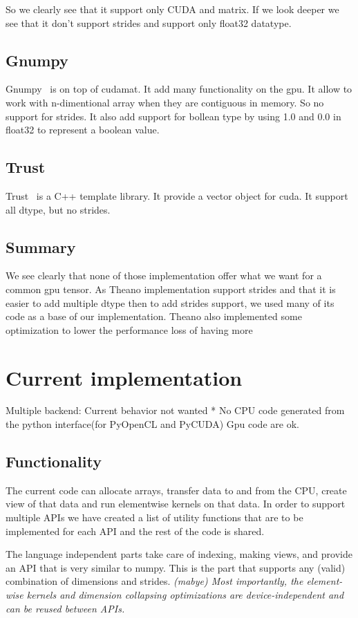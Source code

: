 \documentclass{article} %
\begin{document}
So we clearly see that it support only CUDA and matrix. If we look deeper we see that it don't support strides and support only float32 datatype.

\subsection{Gnumpy}
Gnumpy~\citep{gnumpy-TR2010} is on top of cudamat. It add many functionality on the gpu. It allow to work with n-dimentional array when they are contiguous in memory. So no support for strides. It also add support for bollean type by using 1.0 and 0.0 in float32 to represent a boolean value.

\subsection{Trust}
Trust~\citep{Thrust} is a C++ template library. It provide a vector object for cuda. It support all dtype, but no strides.

\subsection{Summary}
We see clearly that none of those implementation offer what we want for a common gpu tensor. As Theano implementation support strides and that it is easier to add multiple dtype then to add strides support, we used many of its code as a base of our implementation. Theano also implemented some optimization to lower the performance loss of having more

\section{Current implementation}

Multiple backend:
Current behavior not wanted
    * No CPU code generated from the python interface(for PyOpenCL and PyCUDA) Gpu code are ok.

\subsection{Functionality}

The current code can allocate arrays, transfer data to and from the CPU, create view of that data and run elementwise kernels on that data.  In order to support multiple APIs we have created a list of utility functions that are to be implemented for each API and the rest of the code is shared.

The language independent parts take care of indexing, making views, and provide an API that is very similar to numpy.  This is the part that supports any (valid) combination of dimensions and strides.  \emph{(mabye) Most importantly, the element-wise kernels and dimension collapsing optimizations are device-independent and can be reused between APIs.}
\end{document}
